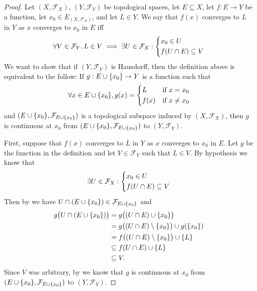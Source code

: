 \begin{proof}
  Let \((X, \mathcal{F}_X)\), \((Y, \mathcal{F}_Y)\) be topological spaces, let \(E \subseteq X\), let \(f : E \to Y\) be a function, let \(x_0 \in \overline{E}_{(X, \mathcal{F}_X)}\), and let \(L \in Y\).
  We say that \(f(x)\) converges to \(L\) in \(Y\) as \(x\) converges to \(x_0\) in \(E\) iff
  \[
    \forall V \in \mathcal{F}_Y, L \in V \implies \exists U \in \mathcal{F}_X : \begin{dcases}
      x_0 \in U \\
      f(U \cap E) \subseteq V
    \end{dcases}
  \]
  We want to show that if \((Y, \mathcal{F}_Y)\) is Hausdorff, then the definition above is equivalent to the follow:
  If \(g : E \cup \left\lbrace x_0\right\rbrace \to Y\) is a function such that
  \[
    \forall x \in E \cup \set{x_0}, g(x) = \begin{dcases}
      L    & \text{if } x = x_0    \\
      f(x) & \text{if } x \neq x_0
    \end{dcases}
  \]
  and \((E \cup \set{x_0}, \mathcal{F}_{E \cup \set{x_0}})\) is a topological subspace induced by \((X, \mathcal{F}_X)\), then \(g\) is continuous at \(x_0\) from \((E \cup \set{x_0}, \mathcal{F}_{E \cup \set{x_0}})\) to \((Y, \mathcal{F}_Y)\).

  First, suppose that \(f(x)\) converges to \(L\) in \(Y\) as \(x\) converges to \(x_0\) in \(E\).
  Let \(g\) be the function in the definition and let \(V \in \mathcal{F}_Y\) such that \(L \in V\).
  By hypothesis we know that
  \[
    \exists U \in \mathcal{F}_X : \begin{dcases}
      x_0 \in U \\
      f(U \cap E) \subseteq V
    \end{dcases}
  \]
  Then by  we have \(U \cap (E \cup \left\lbrace x_0\right\rbrace) \in \mathcal{F}_{E \cup \left\lbrace x_0\right\rbrace}\) and
  \begin{align*}
    g\big(U \cap (E \cup \set{x_0})\big) & = g\big((U \cap E) \cup \set{x_0}\big)                        \\
                                         & = g\big((U \cap E) \setminus \set{x_0}\big) \cup g(\set{x_0}) \\
                                         & = f\big((U \cap E) \setminus \set{x_0}\big) \cup \set{L}      \\
                                         & \subseteq f(U \cap E) \cup \set{L}                            \\
                                         & \subseteq V.
  \end{align*}
  Since \(V\) was arbitrary, by  we know that \(g\) is continuous at \(x_0\) from \((E \cup \set{x_0}, \mathcal{F}_{E \cup \set{x_0}})\) to \((Y, \mathcal{F}_Y)\).


\end{proof}
